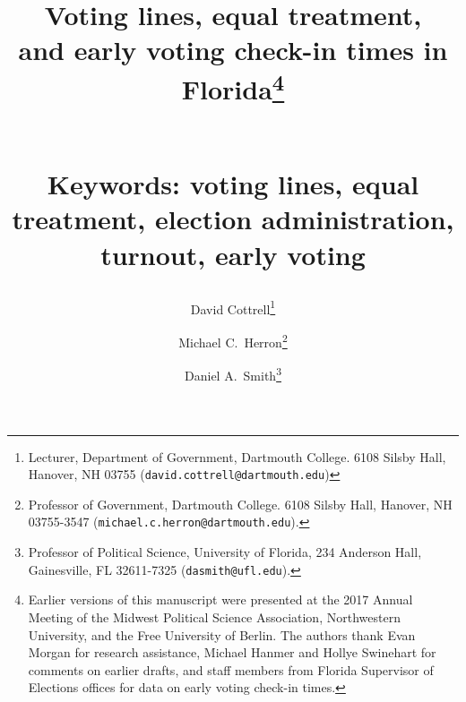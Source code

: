 \documentclass[12pt,titlepage]{article}
\providecommand{\keywords}[1]{\textbf{\normalsize{Keywords: }} \normalsize{#1}}
\begin{document}
\sloppy
\thispagestyle{empty}


\renewcommand{\topfraction}{.85}
\renewcommand{\bottomfraction}{.7}
\renewcommand{\textfraction}{.15}
\renewcommand{\floatpagefraction}{.66}
\renewcommand{\dbltopfraction}{.66}
\renewcommand{\dblfloatpagefraction}{.66}


\title{Voting lines, equal treatment,\\and early voting check-in times
  in Florida\thanks{Earlier versions of this manuscript were presented
    at the 2017 Annual Meeting of the Midwest Political Science
    Association, Northwestern University, and the Free University of
    Berlin.  The authors thank Evan Morgan for research assistance,
    Michael Hanmer and Hollye Swinehart for comments on earlier
    drafts, and staff members from Florida Supervisor of Elections
    offices for data on early voting check-in times.}\author{David
    Cottrell\thanks{Lecturer, Department of Government, Dartmouth
      College.  6108 Silsby Hall, Hanover, NH 03755
      (\texttt{david.cottrell@dartmouth.edu})} \and Michael C.\
    Herron\thanks{Professor of Government, Dartmouth College.  6108
      Silsby Hall, Hanover, NH 03755-3547
      (\texttt{michael.c.herron@dartmouth.edu}).} \and Daniel A.\
    Smith\thanks{Professor of Political Science, University of
      Florida, 234 Anderson Hall, Gainesville, FL 32611-7325
      (\texttt{dasmith@ufl.edu}).}}\vspace{1cm}\\\keywords{voting
    lines, equal treatment, election administration, turnout, early
    voting}}



\maketitle \doublespacing 



\end{document}
